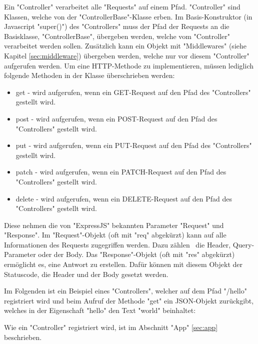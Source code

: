 \label{sec:controller}

Ein "Controller" verarbeitet alle "Requests" auf einem Pfad. 
"Controller" sind Klassen, welche von der "ControllerBase"-Klasse erben. 
Im Basis-Konstruktor (in Javascript "{\ttfamily super()}") des "Controllers" muss der Pfad der Requests an die Basisklasse, "ControllerBase", übergeben werden, welche vom "Controller" verarbeitet werden sollen. 
Zusätzlich kann ein Objekt mit "Middlewares" (siehe Kapitel \ref{sec:middleware}) übergeben werden, welche nur vor diesem "Controller" aufgerufen werden. 
Um eine HTTP-Methode zu implementieren, müssen lediglich folgende Methoden in der Klasse überschrieben werden:

\begin{itemize}
    \item {\ttfamily get} - wird aufgerufen, wenn ein GET-Request auf den Pfad des "Controllers" gestellt wird.
    \item {\ttfamily post} - wird aufgerufen, wenn ein POST-Request auf den Pfad des "Controllers" gestellt wird.
    \item {\ttfamily put} - wird aufgerufen, wenn ein PUT-Request auf den Pfad des "Controllers" gestellt wird.
    \item {\ttfamily patch} - wird aufgerufen, wenn ein PATCH-Request auf den Pfad des "Controllers" gestellt wird.
    \item {\ttfamily delete} - wird aufgerufen, wenn ein DELETE-Request auf den Pfad des "Controllers" gestellt wird.
\end{itemize}

Diese nehmen die von "ExpressJS" bekannten Parameter "Request" und "Response". 
Im "Request"-Objekt (oft mit "req" abgekürzt) kann auf alle Informationen des Requests zugegriffen werden. Dazu zählen \zb\ die Header, Query-Parameter oder der Body.
Das "Response"-Objekt (oft mit "res" abgekürzt) ermöglicht es, eine Antwort zu erstellen. Dafür können mit diesem Objekt der Statuscode, die Header und der Body gesetzt werden.


Im Folgenden ist ein Beispiel eines "Controllers", welcher auf dem Pfad "/hello" registriert wird und beim Aufruf der Methode "get" ein JSON-Objekt zurückgibt, welches in der Eigenschaft "hello" den Text "world" beinhaltet:


Wie ein "Controller" registriert wird, ist im Abschnitt "App" \ref{sec:app} beschrieben. 